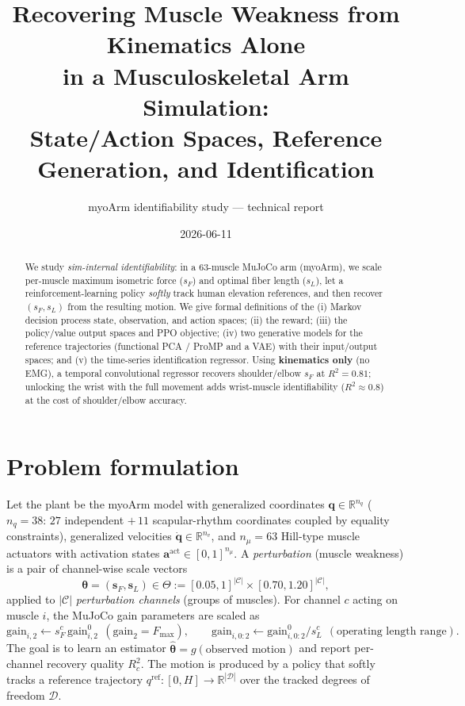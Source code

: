 \documentclass[11pt]{article}
\title{\textbf{Recovering Muscle Weakness from Kinematics Alone\\ in a Musculoskeletal Arm Simulation:\\ State/Action Spaces, Reference Generation, and Identification}}
\author{myoArm identifiability study --- technical report}
\date{2026-06-11}
\newcommand{\R}{\mathbb{R}}
\newcommand{\Cset}{\mathcal{C}}
\newcommand{\Dset}{\mathcal{D}}
\newcommand{\qref}{q^{\mathrm{ref}}}
\renewcommand{\vec}[1]{\mathbf{#1}}
\begin{document}
\maketitle

\begin{abstract}
We study \emph{sim-internal identifiability}: in a 63-muscle MuJoCo arm (myoArm), we scale per-muscle maximum isometric force ($s_F$) and optimal fiber length ($s_L$), let a reinforcement-learning policy \emph{softly} track human elevation references, and then recover $(s_F,s_L)$ from the resulting motion. We give formal definitions of the (i) Markov decision process state, observation, and action spaces; (ii) the reward; (iii) the policy/value output spaces and PPO objective; (iv) two generative models for the reference trajectories (functional PCA / ProMP and a VAE) with their input/output spaces; and (v) the time-series identification regressor. Using \textbf{kinematics only} (no EMG), a temporal convolutional regressor recovers shoulder/elbow $s_F$ at $R^2\!=\!0.81$; unlocking the wrist with the full movement adds wrist-muscle identifiability ($R^2\!\approx\!0.8$) at the cost of shoulder/elbow accuracy.
\end{abstract}

\section{Problem formulation}
Let the plant be the myoArm model with generalized coordinates $\vec q\in\R^{n_q}$ ($n_q{=}38$: $27$ independent $+\,11$ scapular-rhythm coordinates coupled by equality constraints), generalized velocities $\dot{\vec q}\in\R^{n_v}$, and $n_\mu{=}63$ Hill-type muscle actuators with activation states $\vec a^{\mathrm{act}}\in[0,1]^{n_\mu}$. A \emph{perturbation} (muscle weakness) is a pair of channel-wise scale vectors
\begin{equation}
\boldsymbol\theta=(\vec s_F,\vec s_L)\in\Theta:=[0.05,1]^{|\Cset|}\times[0.70,1.20]^{|\Cset|},
\end{equation}
applied to $|\Cset|$ \emph{perturbation channels} (groups of muscles). For channel $c$ acting on muscle $i$, the MuJoCo gain parameters are scaled as
\begin{equation}
\text{gain}_{i,2}\!\leftarrow\! s_F^{c}\,\text{gain}^{0}_{i,2}\ \ (\text{gain}_2{=}F_{\max}),\qquad
\text{gain}_{i,0:2}\!\leftarrow\!\text{gain}^{0}_{i,0:2}/s_L^{c}\ \ (\text{operating length range}).
\end{equation}
The goal is to learn an estimator $\widehat{\boldsymbol\theta}=g(\text{observed motion})$ and report per-channel recovery quality $R^2_c$. The motion is produced by a policy that softly tracks a reference trajectory $\qref:[0,H]\to\R^{|\Dset|}$ over the tracked degrees of freedom $\Dset$.
\end{document}
